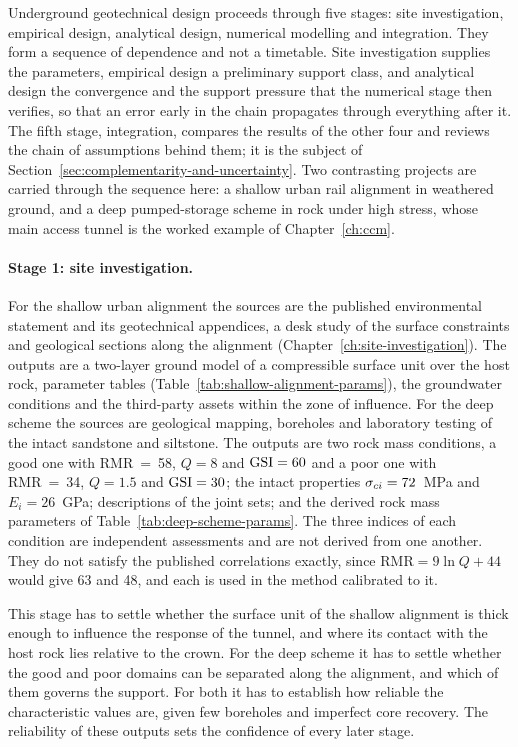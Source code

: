 Underground geotechnical design proceeds through five stages: site
investigation, empirical design, analytical design, numerical modelling and
integration.
They form a sequence of dependence and not a timetable. Site investigation
supplies the parameters, empirical design a preliminary support class, and
analytical design the convergence and the support pressure that the numerical
stage then verifies, so that an error early in the chain propagates through
everything after it. The fifth stage, integration, compares the results of
the other four and reviews the chain of assumptions behind them; it is the
subject of Section~\ref{sec:complementarity-and-uncertainty}. Two contrasting
projects are carried through the sequence here: a shallow urban rail alignment in weathered ground, and a deep
pumped-storage scheme in rock under high stress, whose main access tunnel is
the worked example of Chapter~\ref{ch:ccm}.

\paragraph{Stage 1: site investigation.}
For the shallow urban alignment the sources are the published environmental
statement and its geotechnical appendices, a desk study of the surface
constraints and geological sections along the alignment
(Chapter~\ref{ch:site-investigation}). The outputs are a two-layer ground
model of a compressible surface unit over the host rock, parameter tables
(Table~\ref{tab:shallow-alignment-params}), the groundwater conditions and
the third-party assets within the zone of influence. For the deep scheme the
sources are geological mapping, boreholes and laboratory testing of the
intact sandstone and siltstone. The outputs are two rock mass conditions, a
good one with RMR~=~58, $Q = 8$ and $\mathrm{GSI} = 60$ and a poor one with
RMR~=~34, $Q = 1.5$ and $\mathrm{GSI} = 30$; the intact properties
$\sigma_{ci} = 72$~MPa and $E_i = 26$~GPa; descriptions of the joint sets; and the
derived rock mass parameters of Table~\ref{tab:deep-scheme-params}. The three
indices of each condition are independent assessments and are not derived
from one another. They do not satisfy the published correlations exactly,
since $\mathrm{RMR} = 9\ln Q + 44$ would give 63 and 48, and each is used in
the method calibrated to it.

This stage has to settle whether the surface unit of the shallow alignment is
thick enough to influence the response of the tunnel, and where its contact
with the host rock lies relative to the crown. For the deep scheme it has to
settle whether the good and poor domains can be separated along the
alignment, and which of them governs the support. For both it has to
establish how reliable the characteristic values are, given few boreholes and
imperfect core recovery. The reliability of these outputs sets the
confidence of every later stage.

